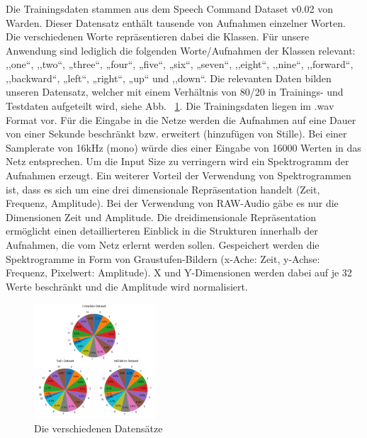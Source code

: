 \documentclass[sigconf]{acmart}
\begin{document}
\subsubsection{}
Die Trainingsdaten stammen aus dem Speech Command Dataset v0.02 von Warden\cite{speechcommandsv2}. Dieser Datensatz enthält tausende von Aufnahmen einzelner Worten. Die verschiedenen Worte repräsentieren dabei die Klassen. Für unsere Anwendung sind lediglich die folgenden Worte/Aufnahmen der Klassen relevant: 
\newline
\newline
,,one“, ,,two“, „three“, „four“, „five“, „six“, „seven“, ,,eight“, ,,nine“, ,,forward“, ,,backward“, „left“, „right“, „up“ und ,,down“. 
\newline
\newline
Die relevanten Daten bilden unseren Datensatz, welcher mit einem Verhältnis von 80/20 in Trainings- und Testdaten aufgeteilt wird, siehe Abb. ~\ref{fig:TrainingsDaten}.
\newline
\newline
Die Trainingsdaten liegen im .wav Format vor. Für die Eingabe in die Netze werden die Aufnahmen auf eine Dauer von einer Sekunde beschränkt bzw. erweitert (hinzufügen von Stille). Bei einer Samplerate von 16kHz (mono) würde dies einer Eingabe von 16000 Werten in das Netz entsprechen. Um die Input Size zu verringern wird ein Spektrogramm der Aufnahmen erzeugt.  
Ein weiterer Vorteil der Verwendung von Spektrogrammen ist, dass es sich um eine drei dimensionale Repräsentation handelt (Zeit, Frequenz, Amplitude). Bei der Verwendung von RAW-Audio gäbe es nur die Dimensionen Zeit und Amplitude. Die dreidimensionale Repräsentation ermöglicht einen detaillierteren Einblick in die Strukturen innerhalb der Aufnahmen, die vom Netz erlernt werden sollen. Gespeichert werden die Spektrogramme in Form von Graustufen-Bildern (x-Ache: Zeit, y-Achse: Frequenz, Pixelwert: Amplitude). X und Y-Dimensionen werden dabei auf je 32 Werte beschränkt und die Amplitude wird normalisiert. 
\begin{figure}[ht]
  \includegraphics[width=0.4\textwidth]{images/DataBalance}
  \caption{Die verschiedenen Datensätze}
  \Description{}
  \label{fig:TrainingsDaten}
\end{figure}
\end{document}
